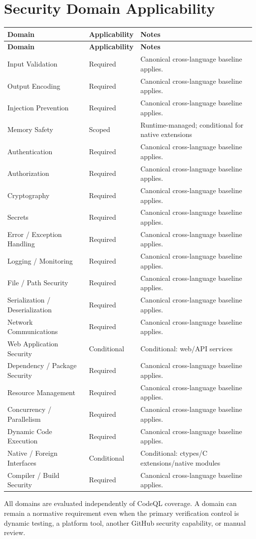 \documentclass[10pt,letterpaper]{article}
\begin{document}
\section{Security Domain Applicability}
\small
\setlength{\tabcolsep}{3pt}
\begin{longtable}{@{}P{1.8in}P{0.85in}P{3.75in}@{}}
\toprule
\textbf{Domain} & \textbf{Applicability} & \textbf{Notes}\\
\midrule
\endfirsthead
\toprule
\textbf{Domain} & \textbf{Applicability} & \textbf{Notes}\\
\midrule
\endhead
Input Validation & Required & Canonical cross-language baseline applies.\\
Output Encoding & Required & Canonical cross-language baseline applies.\\
Injection Prevention & Required & Canonical cross-language baseline applies.\\
Memory Safety & Scoped & Runtime-managed; conditional for native extensions\\
Authentication & Required & Canonical cross-language baseline applies.\\
Authorization & Required & Canonical cross-language baseline applies.\\
Cryptography & Required & Canonical cross-language baseline applies.\\
Secrets & Required & Canonical cross-language baseline applies.\\
Error / Exception Handling & Required & Canonical cross-language baseline applies.\\
Logging / Monitoring & Required & Canonical cross-language baseline applies.\\
File / Path Security & Required & Canonical cross-language baseline applies.\\
Serialization / Deserialization & Required & Canonical cross-language baseline applies.\\
Network Communications & Required & Canonical cross-language baseline applies.\\
Web Application Security & Conditional & Conditional: web/API services\\
Dependency / Package Security & Required & Canonical cross-language baseline applies.\\
Resource Management & Required & Canonical cross-language baseline applies.\\
Concurrency / Parallelism & Required & Canonical cross-language baseline applies.\\
Dynamic Code Execution & Required & Canonical cross-language baseline applies.\\
Native / Foreign Interfaces & Conditional & Conditional: ctypes/C extensions/native modules\\
Compiler / Build Security & Required & Canonical cross-language baseline applies.\\
\bottomrule
\end{longtable}
\normalsize
All domains are evaluated independently of CodeQL coverage. A domain can remain a normative requirement even when the primary verification control is dynamic testing, a platform tool, another GitHub security capability, or manual review.
\end{document}
